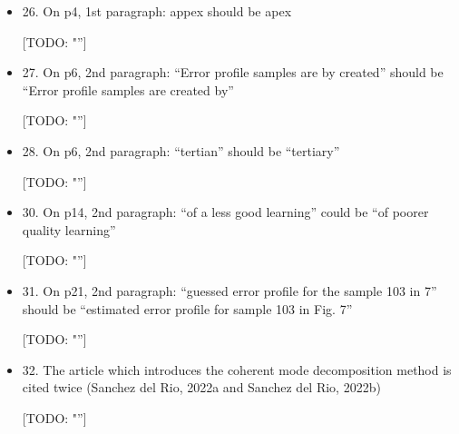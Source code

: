 \documentclass[11pt]{letter} %
\newcommand{\todo}[1]{{\color{red}[TODO: "#1'']}}
\begin{document}
\begin{letter}{}
\begin{itemize}
    \todo{}
    
    \item 26. On p4, 1st paragraph: appex should be apex
    
    \todo{}
    
    \item 27. On p6, 2nd paragraph: “Error profile samples are by created” should be “Error profile samples are created by”
    
    \todo{}
    
    \item 28. On p6, 2nd paragraph: “tertian” should be “tertiary”
    
    \todo{}
    
    \item 30. On p14, 2nd paragraph: “of a less good learning” could be “of poorer quality learning”
    
    \todo{}
    
    \item 31. On p21, 2nd paragraph: “guessed error profile for the sample 103 in 7” should be “estimated error profile for sample 103 in Fig. 7”
    
    \todo{}
    
    \item 32. The article which introduces the coherent mode decomposition method is cited twice (Sanchez del Rio, 2022a and Sanchez del Rio, 2022b)
    
    \todo{}
    
\end{itemize}

\end{letter}
 
\end{document}
